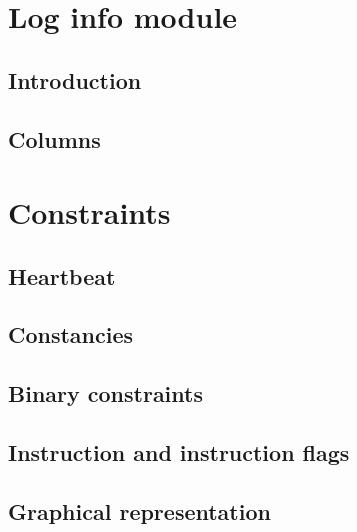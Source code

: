 \section{Log info module}                            \label{log info: generalities}
\subsection{Introduction}                            \label{log info: generalities: intro}                 
\subsection{Columns}                                 \label{log info: generalities: columns}               

\section{Constraints}                                \label{log info: constraints}
\subsection{Heartbeat}                               \label{log info: constraints: heartbeat}              
\subsection{Constancies}                             \label{log info: constraints: constancies}            
\subsection{Binary constraints}                      \label{log info: constraints: binary}                 
\subsection{Instruction and instruction flags}       \label{log info: constraints: inst and flags}         
\subsection{Graphical representation}                \label{log info: constraints: graphical rep data}     
